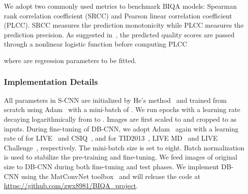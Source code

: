 \documentclass[journal]{IEEEtran}
\begin{document}
We adopt two commonly used metrics to benchmark BIQA models: Spearman rank correlation coefficient (SRCC) and Pearson linear correlation coefficient (PLCC). SRCC measures the prediction monotonicity while PLCC measures the prediction precision. As suggested in~\cite{video2003final}, the predicted quality scores are passed through a nonlinear logistic function before computing PLCC

where  are regression parameters to be fitted.

\subsubsection{Implementation Details}\label{subsec:impldetail}
All parameters in S-CNN are initialized by He's method~\cite{he2015delving} and trained from scratch using Adam~\cite{Kingma2014adam} with a mini-batch of .  We run  epochs with a learning rate decaying logarithmically from  to . Images are first scaled to  and cropped to  as inputs. During fine-tuning of DB-CNN, we adopt Adam~\cite{Kingma2014adam} again with a learning rate of  for LIVE~\cite{sheikh2006statistical} and CSIQ~\cite{larson2010most}, and  for TID2013~\cite{ponomarenko2013color}, LIVE MD~\cite{Jayaraman2013Objective} and LIVE Challenge~\cite{ghadiyaram2016massive}, respectively. The mini-batch size is set to eight. Batch normalization~\cite{ioffe2015batch} is used to stabilize the pre-training and fine-tuning.
We feed images of original size to DB-CNN during both fine-tuning and test phases. We implement DB-CNN using the MatConvNet toolbox~\cite{vedaldi2015matconvnet} and will release the code at \url{https://github.com/zwx8981/BIQA_project}.
\end{document}
